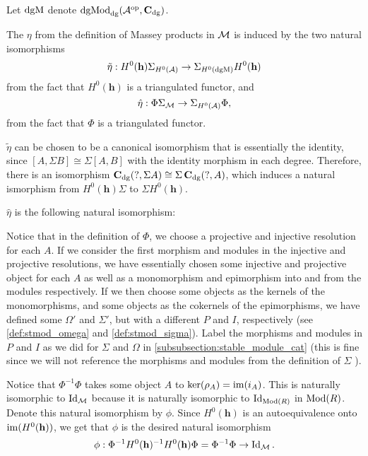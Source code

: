 \begin{remark}
    Let \( \operatorname{dgM} \) denote \( \operatorname{dgMod}_{\operatorname{dg}}({\mathcal{A}}^{\operatorname{op}}, \operatorname{\mathbf{C}}_{\operatorname{dg}}) \).

    The \( \eta \) from the definition of Massey products in \( {\mathcal{M}} \) is induced by the two natural isomorphisms
    \[
        \tilde{\eta}: H^0(\mathbf{h}) \Sigma_{H^0({\mathcal{A}})} \to \Sigma_{H^0(\operatorname{dgM})} H^0(\mathbf{h})
    \]
    from the fact that \( H^0(\mathbf{h}) \) is a triangulated functor, and
    \[
        \hat{\eta}: \Phi \Sigma_{{\mathcal{M}}} \to \Sigma_{H^0({\mathcal{A}})} \Phi,
    \]
    from the fact that \( \Phi \) is a triangulated functor.

    \( \tilde{\eta} \) can be chosen to be a canonical isomorphism that is essentially the identity, since \( [A, \Sigma B] \cong \Sigma [A, B] \) with the identity morphism in each degree. Therefore, there is an isomorphism \( \operatorname{\mathbf{C}}_{\operatorname{dg}}(?, \Sigma A) \cong \Sigma \operatorname{\mathbf{C}}_{\operatorname{dg}}(?, A) \), which induces a natural ismorphism from \( H^0(\mathbf{h}) \Sigma \) to \( \Sigma H^0(\mathbf{h}) \).

    \( \hat{\eta} \) is the following natural isomorphism:

    Notice that in the definition of \( \Phi \), we choose a projective and injective resolution for each \( A \). If we consider the first morphism and modules in the injective and projective resolutions, we have essentially chosen some injective and projective object for each \( A \) as well as a monomorphism and epimorphism into and from the modules respectively. If we then choose some objects as the kernels of the monomorphisms, and some objects as the cokernels of the epimorphisms, we have defined some \( \Omega' \) and \( \Sigma' \), but with a different \( P \) and \( I \), respectively (see \autoref{def:stmod_omega} and \autoref{def:stmod_sigma}). Label the morphisms and modules in \( P \) and \( I \) as we did for \( \Sigma \) and \( \Omega \) in \autoref{subsubsection:stable_module_cat} (this is fine since we will not reference the morphisms and modules from the definition of \( \Sigma \) ).

    Notice that \( \Phi^{-1} \Phi \) takes some object \( A \) to \( \ker(\rho_A) = \operatorname{im}(i_A) \). This is naturally isomorphic to \( \operatorname{Id}_{{\mathcal{M}}} \) because it is naturally isomorphic to \( \operatorname{Id}_{\operatorname{Mod}(R)} \) in \( \operatorname{Mod}(R) \). Denote this natural isomorphism by \( \phi \). Since \( H^0(\mathbf{h}) \) is an autoequivalence onto \( \operatorname{im}(H^0(\mathbf{h})) \), we get that \( \phi \) is the desired natural isomorphism
    \[
        \phi: \Phi^{-1} H^0(\mathbf{h})^{-1} H^0(\mathbf{h}) \Phi = \Phi^{-1} \Phi \to \operatorname{Id}_{{\mathcal{M}}}.
    \]
    

\end{remark}
